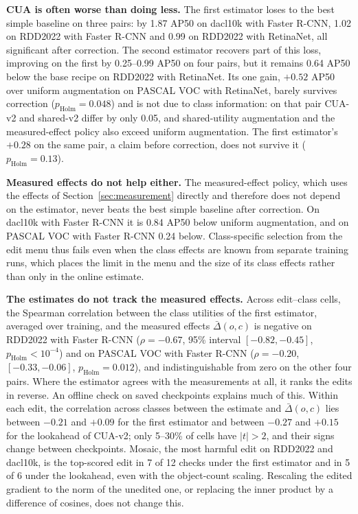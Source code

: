 \documentclass[conference]{IEEEtran}
\begin{document}
\noindent\textbf{CUA is often worse than doing less.} The first estimator loses to the best simple baseline on three pairs: by 1.87 AP50 on dacl10k with Faster R-CNN, 1.02 on RDD2022 with Faster R-CNN and 0.99 on RDD2022 with RetinaNet, all significant after correction. The second estimator recovers part of this loss, improving on the first by 0.25--0.99 AP50 on four pairs, but it remains 0.64 AP50 below the base recipe on RDD2022 with RetinaNet. Its one gain, $+0.52$ AP50 over uniform augmentation on PASCAL VOC with RetinaNet, barely survives correction ($p_{\mathrm{Holm}}=0.048$) and is not due to class information: on that pair CUA-v2 and shared-v2 differ by only 0.05, and shared-utility augmentation and the measured-effect policy also exceed uniform augmentation. The first estimator's $+0.28$ on the same pair, a claim before correction, does not survive it ($p_{\mathrm{Holm}}=0.13$).

\noindent\textbf{Measured effects do not help either.} The measured-effect policy, which uses the effects of Section~\ref{sec:measurement} directly and therefore does not depend on the estimator, never beats the best simple baseline after correction. On dacl10k with Faster R-CNN it is 0.84 AP50 below uniform augmentation, and on PASCAL VOC with Faster R-CNN 0.24 below. Class-specific selection from the edit menu thus fails even when the class effects are known from separate training runs, which places the limit in the menu and the size of its class effects rather than only in the online estimate.

\noindent\textbf{The estimates do not track the measured effects.} Across edit--class cells, the Spearman correlation between the class utilities of the first estimator, averaged over training, and the measured effects $\bar\Delta(o,c)$ is negative on RDD2022 with Faster R-CNN ($\rho=-0.67$, 95\% interval $[-0.82,-0.45]$, $p_{\mathrm{Holm}}<10^{-4}$) and on PASCAL VOC with Faster R-CNN ($\rho=-0.20$, $[-0.33,-0.06]$, $p_{\mathrm{Holm}}=0.012$), and indistinguishable from zero on the other four pairs. Where the estimator agrees with the measurements at all, it ranks the edits in reverse. An offline check on saved checkpoints explains much of this. Within each edit, the correlation across classes between the estimate and $\bar\Delta(o,c)$ lies between $-0.21$ and $+0.09$ for the first estimator and between $-0.27$ and $+0.15$ for the lookahead of CUA-v2; only 5--30\% of cells have $|t|>2$, and their signs change between checkpoints. Mosaic, the most harmful edit on RDD2022 and dacl10k, is the top-scored edit in 7 of 12 checks under the first estimator and in 5 of 6 under the lookahead, even with the object-count scaling. Rescaling the edited gradient to the norm of the unedited one, or replacing the inner product by a difference of cosines, does not change this.
\end{document}
